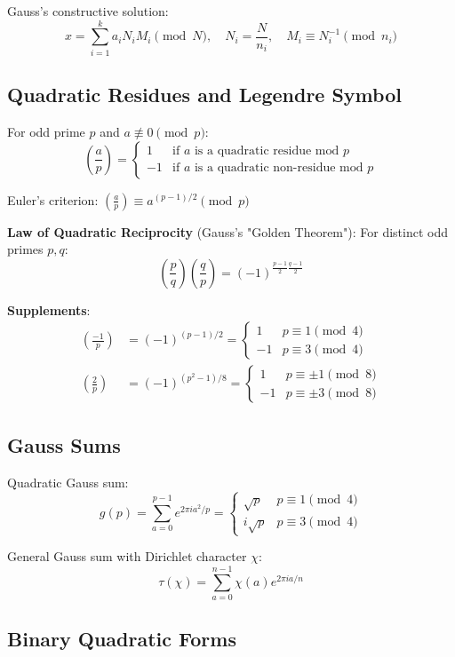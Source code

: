 Gauss's constructive solution:
\[
x = \sum_{i=1}^k a_i N_i M_i \pmod{N}, \quad
N_i = \frac{N}{n_i},\quad M_i \equiv N_i^{-1} \pmod{n_i}
\]

\subsection{Quadratic Residues and Legendre Symbol}

For odd prime $p$ and $a \not\equiv 0 \pmod{p}$:
\[
\left(\frac{a}{p}\right) = 
\begin{cases}
1 & \text{if } a \text{ is a quadratic residue mod } p \\
-1 & \text{if } a \text{ is a quadratic non-residue mod } p
\end{cases}
\]

Euler's criterion: $\left(\frac{a}{p}\right) \equiv a^{(p-1)/2} \pmod{p}$

\textbf{Law of Quadratic Reciprocity} (Gauss's "Golden Theorem"):
For distinct odd primes $p, q$:
\[
\left(\frac{p}{q}\right)\left(\frac{q}{p}\right) = (-1)^{\frac{p-1}{2}\frac{q-1}{2}}
\]

\textbf{Supplements}:
\begin{align*}
\left(\frac{-1}{p}\right) &= (-1)^{(p-1)/2} = \begin{cases} 1 & p \equiv 1 \pmod{4} \\ -1 & p \equiv 3 \pmod{4} \end{cases} \\
\left(\frac{2}{p}\right) &= (-1)^{(p^2-1)/8} = \begin{cases} 1 & p \equiv \pm 1 \pmod{8} \\ -1 & p \equiv \pm 3 \pmod{8} \end{cases}
\end{align*}

\subsection{Gauss Sums}

Quadratic Gauss sum:
\[
g(p) = \sum_{a=0}^{p-1} e^{2\pi i a^2/p} = 
\begin{cases}
\sqrt{p} & p \equiv 1 \pmod{4} \\
i\sqrt{p} & p \equiv 3 \pmod{4}
\end{cases}
\]

General Gauss sum with Dirichlet character $\chi$:
\[
\tau(\chi) = \sum_{a=0}^{n-1} \chi(a) e^{2\pi i a/n}
\]

\subsection{Binary Quadratic Forms}

